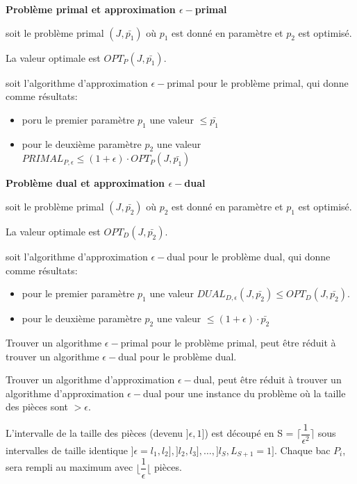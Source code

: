\documentclass[a4paper,12pt]{report}
\theoremstyle{plain}				%
\theoremstyle{definition}				%
\begin{document}
\bigskip

\textbf{Problème primal et approximation $\epsilon-$primal}

soit le problème primal $(J,\bar{p_1})$
où $p_1$ est donné en paramètre et $p_2$ est optimisé.

La valeur optimale est $OPT_P(J,\bar{p_1})$.

soit l'algorithme d'approximation $\epsilon-$primal pour le problème primal, qui donne comme résultats:

\begin{itemize}
\item poru le premier paramètre $p_1$ une valeur $\le \bar{p_1}$
\item pour le deuxième paramètre $p_2$ une valeur $PRIMAL_{P,\epsilon} \le (1+\epsilon)\cdot OPT_P(J,\bar{p_1})$
\end{itemize}
\bigskip

\textbf{Problème dual et approximation $\epsilon-$dual}

soit le problème primal $(J,\bar{p_2})$
où $p_2$ est donné en paramètre et $p_1$ est optimisé.

La valeur optimale est $OPT_D(J,\bar{p_2})$.

soit l'algorithme d'approximation $\epsilon-$dual pour le problème dual, qui donne comme résultats:

\begin{itemize}
\item pour le premier paramètre $p_1$ une valeur $DUAL_{D,\epsilon}(J, \bar{p_2})\le OPT_D(J,\bar{p_2})$.
\item pour le deuxième paramètre $p_2$ une valeur $ \le (1+\epsilon)\cdot \bar{p_2}$
\end{itemize}

\bigskip

Trouver un algorithme $\epsilon-$primal pour le problème primal,
peut être réduit à trouver un algorithme $\epsilon-$dual pour le problème dual.

Trouver un algorithme d'approximation $\epsilon-$dual, peut être réduit à trouver un algorithme
d'approximation $\epsilon-$dual pour une instance du problème où la taille des pièces sont $> \epsilon$.

L'intervalle de la taille des pièces (devenu $]\epsilon, 1]$) est
découpé en S = $\lceil \dfrac{1}{\epsilon^2}\rceil$ sous intervalles
de taille identique
$]\epsilon = l_1, l_2], ]l_2, l_3], \ldots , ]l_S, L_{S+1}=1]$.
Chaque bac $P_i$, sera rempli au maximum avec
$\lfloor \dfrac{1}{\epsilon} \lfloor$ pièces.
\end{document}
